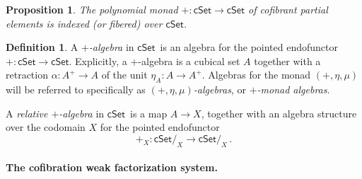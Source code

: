 \documentclass[11pt]{amsart}
\newcommand{\cSet}{\ensuremath{\mathsf{cSet}}}
\newcommand{\ra}{\ensuremath{\rightarrow}}
\newcommand{\too}{\ensuremath{\longrightarrow}}
\newtheorem{proposition}[theorem]{Proposition}
\theoremstyle{remark}
\theoremstyle{definition}
\newtheorem{definition}[theorem]{Definition}
\begin{document}
\begin{proposition}\label{prop:fiberedpolymonad}
The polynomial monad $+ : \cSet \ra \cSet$ of \emph{cofibrant partial elements} is indexed (or fibered) over \cSet.
\end{proposition}

\begin{definition}\label{def:+alg}
A \emph{$+$-algebra} in \cSet\ is an algebra for the pointed endofunctor $+ : \cSet\ra \cSet$.  Explicitly, a $+$-algebra is a cubical set $A$ together with a retraction $\alpha : A^+\ra A$ of the unit $\eta_A : A \ra A^+$.  Algebras for the monad $(+, \eta, \mu)$ will be referred to specifically as \emph{$(+, \eta, \mu)$-algebras}, or \emph{$+$-monad algebras}. 

A \emph{relative $+$-algebra} in \cSet\ is a map $A \ra X$, together with an algebra structure over the codomain $X$ for the pointed endofunctor $$+_X : \cSet/_X \too \cSet/_X\,.$$
\end{definition}

\paragraph{The cofibration weak factorization system.}
\end{document}
